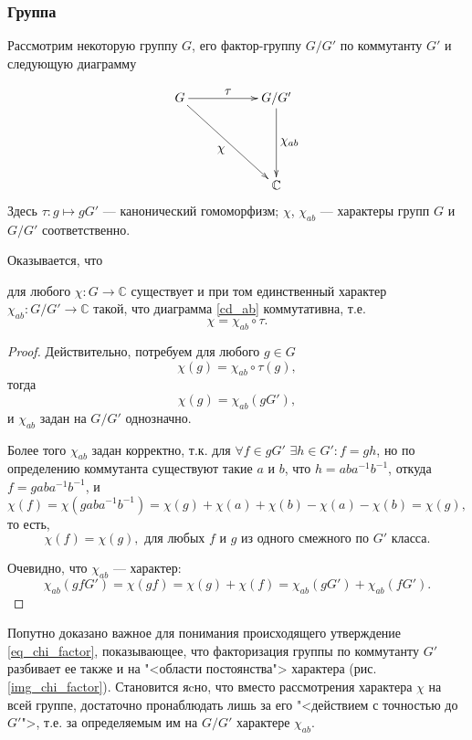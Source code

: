 \subsubsection{Группа}
    Рассмотрим некоторую группу $G$, его фактор-группу $G/G'$ по коммутанту 
    $G'$ и следующую диаграмму

    \begin{equation}\label{cd_ab}
        \xymatrix{
            G \ar[rr]^{\textstyle{\tau}} \ar[rrdd]_{\textstyle{\chi}} & & G/G'\ar[dd]^{\textstyle{\chi_{ab}}} \\
            & & \\
            & & \mathbb{C}
        }
    \end{equation}
    Здесь $\tau: g \mapsto gG'$ --- канонический гомоморфизм; $\chi$, 
    $\chi_{ab}$ --- характеры групп $G$ и $G/G'$ соответственно.

    Оказывается, что 
    \begin{statement} для любого $\chi : G \to \mathbb{C}$ существует и при том 
        единственный характер $\chi_{ab} : G/G' \to \mathbb{C}$ такой, что диаграмма 
        \eqref{cd_ab} коммутативна, т.е. 
        \[\chi = \chi_{ab} \circ \tau.\]
    \end{statement}

    \begin{proof} Действительно, потребуем для любого $g \in G$
    \[\chi(g) = \chi_{ab} \circ \tau (g),\]
    тогда
    \[\chi(g) = \chi_{ab} (gG'),\]
    и $\chi_{ab}$ задан на $G/G'$ однозначно.

    Более того $\chi_{ab}$ задан корректно, т.к. для $\forall f \in gG'$ 
    $\exists h \in G': f = gh$, но по определению коммутанта существуют такие 
    $a$ и $b$, что $h = aba^{-1}b^{-1}$, откуда $f = gaba^{-1}b^{-1}$, и 
    \[\chi(f) = \chi(gaba^{-1}b^{-1}) 
    = \chi(g) + \chi(a) + \chi(b) - \chi(a) - \chi(b) = \chi(g),\]
    то есть,
    \begin{equation}\label{eq_chi_factor}
        \chi(f) = \chi(g),\text{ для любых $f$ и $g$ из одного смежного по $G'$ класса.}
    \end{equation}
    
    Очевидно, что $\chi_{ab}$ --- характер:
    \[\chi_{ab}(gf G') = \chi(gf) = \chi(g) + \chi(f) = \chi_{ab}(gG') + \chi_{ab}(fG').\]
    \end{proof}
    
    \begin{remark} Попутно доказано важное для понимания происходящего 
        утверждение \eqref{eq_chi_factor}, показывающее, что факторизация 
        группы по коммутанту $G'$ разбивает ее также и на "<области постоянства"> 
        характера (рис. \ref{img_chi_factor}). Становится яcно, что вместо 
        рассмотрения характера $\chi$ на всей группе, достаточно пронаблюдать 
        лишь за его "<действием с точностью до $G'$">, т.е. за определяемым им 
        на $G/G'$ характере $\chi_{ab}$.
    \end{remark}
    
